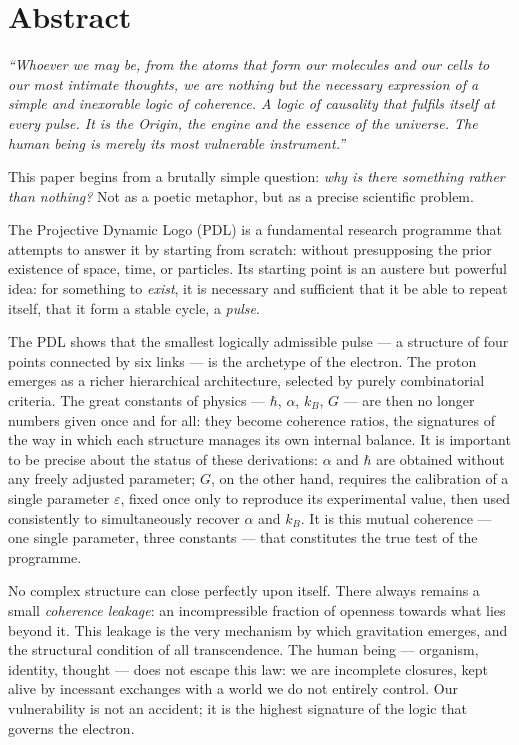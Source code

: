 \documentclass[11pt, a4paper, openright]{book}
\begin{document}
\chapter*{Abstract}

\textit{%
``Whoever we may be, from the atoms that form our molecules and our
cells to our most intimate thoughts, we are nothing but
the necessary expression of a simple and inexorable logic of coherence.
A logic of causality that fulfils itself at every pulse.
It is the Origin, the engine and the essence of the universe.
The human being is merely its most vulnerable instrument.''}

\medskip

This paper begins from a brutally simple question: \emph{why is there something rather than nothing?} Not as a poetic metaphor, but as a precise scientific problem.

\medskip

The Projective Dynamic Logo (PDL) is a fundamental research programme that attempts to answer it by starting from scratch: without presupposing the prior existence of space, time, or particles. Its starting point is an austere but powerful idea: for something to \emph{exist}, it is necessary and sufficient that it be able to repeat itself, that it form a stable cycle, a \emph{pulse}.

\medskip

The PDL shows that the smallest logically admissible pulse --- a structure of four points connected by six links --- is the archetype of the electron. The proton emerges as a richer hierarchical architecture, selected by purely combinatorial criteria. The great constants of physics --- $\hbar$, $\alpha$, $k_B$, $G$ --- are then no longer numbers given once and for all: they become coherence ratios, the signatures of the way in which each structure manages its own internal balance. It is important to be precise about the status of these derivations: $\alpha$ and $\hbar$ are obtained without any freely adjusted parameter; $G$, on the other hand, requires the calibration of a single parameter $\varepsilon$, fixed once only to reproduce its experimental value, then used consistently to simultaneously recover $\alpha$ and $k_B$. It is this mutual coherence --- one single parameter, three constants --- that constitutes the true test of the programme.

\medskip

No complex structure can close perfectly upon itself. There always remains a small \emph{coherence leakage}: an incompressible fraction of openness towards what lies beyond it. This leakage is the very mechanism by which gravitation emerges, and the structural condition of all transcendence. The human being --- organism, identity, thought --- does not escape this law: we are incomplete closures, kept alive by incessant exchanges with a world we do not entirely control. Our vulnerability is not an accident; it is the highest signature of the logic that governs the electron.
\end{document}
